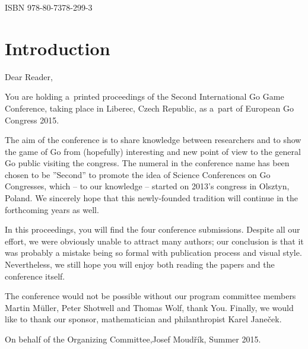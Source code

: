 \documentclass[a4paper,twocolumn,twoside,10pt]{book}
\begin{document}
\noindent
ISBN 978-80-7378-299-3

\vspace*{2\baselineskip}


\endgroup
\clearpage


\chapter*{Introduction}

Dear Reader,

You are holding a~printed proceedings of the Second International Go
Game Conference, taking place in Liberec, Czech Republic, as a~part of
European Go Congress 2015.

The aim of the conference is to share knowledge between researchers
and to show the game of Go from (hopefully) interesting and new point
of view to the general Go public visiting the congress.  The numeral in
the conference name has been chosen to be ''Second'' to promote the idea
of Science Conferences on Go Congresses, which -- to our knowledge --
started on 2013's congress in Olsztyn, Poland. We sincerely hope that this
newly-founded tradition will continue in the forthcoming years as well.

In this proceedings, you will find the four conference
submissions. Despite all our effort, we were obviously unable to attract
many authors; our conclusion is that it was probably a mistake being so
formal with publication process and visual style. Nevertheless, we still
hope you will enjoy both reading the papers and the conference itself.

The conference would not be possible without our program committee members
Martin Müller, Peter Shotwell and Thomas Wolf, thank You. Finally,
we would like to thank our sponsor, mathematician and philanthropist
Karel Janeček.

\vspace*{2ex}
\noindent On behalf of the Organizing Committee,\newline Josef Moudřík,
Summer 2015.

\tableofcontents

\mainmatter

\cleardoublepage
{}


\cleardoublepage
{}

\end{document}
